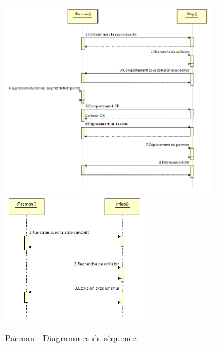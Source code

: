 \begin{figure}[h]
 \centering
 \includegraphics[width=9cm]{../umls/UML_images/Pacman/sequence} \hfill
 \includegraphics[width=6cm]{../umls/UML_images/Pacman/sequence2} \hfill
 \caption{Pacman : Diagrammes de séquence}
\end{figure}


\clearpage

